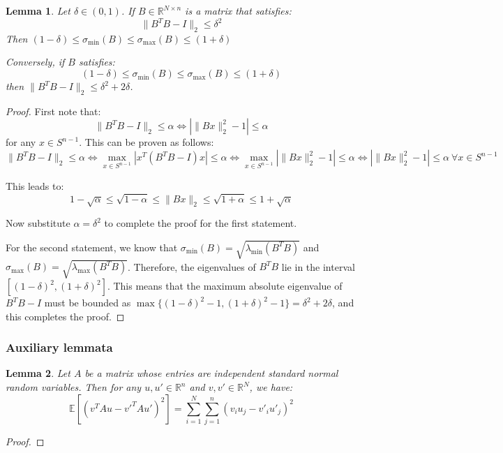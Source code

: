 \documentclass{article}
\newtheorem{lemma}{Lemma}[subsection]
\theoremstyle{remark}
\newcommand{\real}{\mathbb{R}}
\newcommand{\Exp}{\mathbb{E}}
\begin{document}
\begin{lemma}
Let \(\delta \in (0, 1)\). If \(B \in \real^{N \times n}\) is a matrix that satisfies:
\begin{equation*}
\|B^{T}B - I\|_{2} \leq \delta^{2}
\end{equation*}
Then \((1 - \delta) \leq \sigma_{\min}(B) \leq \sigma_{\max}(B) \leq (1 + \delta)\)

Conversely, if \(B\) satisfies:
\begin{equation*}
(1 - \delta) \leq \sigma_{\min}(B) \leq \sigma_{\max}(B) \leq (1 + \delta)
\end{equation*}
then \(\|B^{T}B - I\|_{2} \leq \delta^{2} + 2\delta\).
\end{lemma}

\begin{proof}
First note that:
\begin{equation*}
\|B^{T}B - I\|_{2} \leq \alpha \Leftrightarrow |\|Bx\|_{2}^{2} - 1| \leq \alpha
\end{equation*}
for any \(x \in S^{n - 1}\).
This can be proven as follows:
\begin{equation*}
\|B^{T}B - I\|_{2} \leq \alpha \Leftrightarrow \max_{x \in S^{n-1}} |x^{T}(B^{T}B - I)x| \leq \alpha \Leftrightarrow \max_{x \in S^{n-1}} |\|Bx\|_{2}^{2} - 1| \leq \alpha \Leftrightarrow |\|Bx\|_{2}^{2} - 1| \leq \alpha ~\forall x \in S^{n-1}
\end{equation*}

This leads to:
\begin{equation*}
1 - \sqrt{\alpha} \leq \sqrt{1 - \alpha} \leq \|Bx\|_{2} \leq \sqrt{1 + \alpha} \leq 1 + \sqrt{\alpha}
\end{equation*}

Now substitute \(\alpha = \delta^{2}\) to complete the proof for the first statement.

For the second statement, we know that \(\sigma_{\min}(B) = \sqrt{\lambda_{\min}(B^{T}B)}\) and \(\sigma_{\max}(B) = \sqrt{\lambda_{\max}(B^{T}B)}\). Therefore, the eigenvalues of \(B^{T}B\) lie in the interval \([(1 - \delta)^{2}, (1 + \delta)^{2}]\). This means that the maximum absolute eigenvalue of \(B^{T}B - I\) must be bounded as \(\max\{(1 - \delta)^{2} - 1, (1 + \delta)^{2} - 1\} = \delta^{2} + 2\delta\), and this completes the proof.
\end{proof}


\subsubsection{Auxiliary lemmata}
\begin{lemma}
\label{lem:quadratic-random-mat-iid-entry}
Let \(A\) be a matrix whose entries are independent standard normal random variables. Then for any \(u, u' \in \real^{n}\) and \(v, v' \in \real^{N}\), we have:
\begin{equation*}
\Exp\left[(v^{T}Au - v'^{T}Au')^{2}\right] = \sum_{i=1}^{N}\sum_{j=1}^{n}(v_{i}u_{j} - v'_{i}u'_{j})^{2}
\end{equation*}
\end{lemma}
\begin{proof}

\end{proof}
\end{document}
